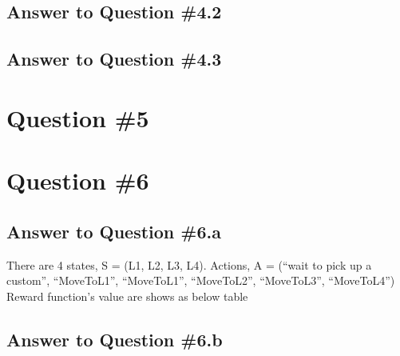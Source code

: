 \documentclass[conference]{styles/acmsiggraph}
\begin{document}
\subsection{Answer to Question \#4.2}

\subsection{Answer to Question \#4.3}

\section{Question \#5}

\section{Question \#6}

\subsection{Answer to Question \#6.a}

There are 4 states, S = (L1, L2, L3, L4).
Actions, A = (“wait to pick up a custom”, “MoveToL1”, “MoveToL1”, “MoveToL2”, “MoveToL3”, “MoveToL4”)
Reward function's value are shows as below table


\subsection{Answer to Question \#6.b}
\end{document}
